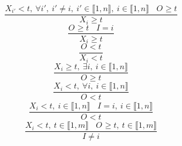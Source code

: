 $$\frac{X_{i'}<t,~\forall i',~i' \neq i,~i' \in \llbracket1,n\rrbracket,~i \in \llbracket1,n\rrbracket~~~~O_{} \geq t}{X_{i} \geq t}$$ $$\frac{O_{} \geq t~~~~I=i}{X_{i} \geq t}$$ $$\frac{O_{}<t}{X_{i}<t}$$ $$\frac{X_{i} \geq t,~\exists i,~i \in \llbracket1,n\rrbracket}{O_{} \geq t}$$ $$\frac{X_{i}<t,~\forall i,~i \in \llbracket1,n\rrbracket}{O_{}<t}$$ $$\frac{X_{i}<t,~i \in \llbracket1,n\rrbracket~~~~I=i,~i \in \llbracket1,n\rrbracket}{O_{}<t}$$ $$\frac{X_{i}<t,~t \in \llbracket1,m\rrbracket~~~~O_{} \geq t,~t \in \llbracket1,m\rrbracket}{I \neq i}$$ 
